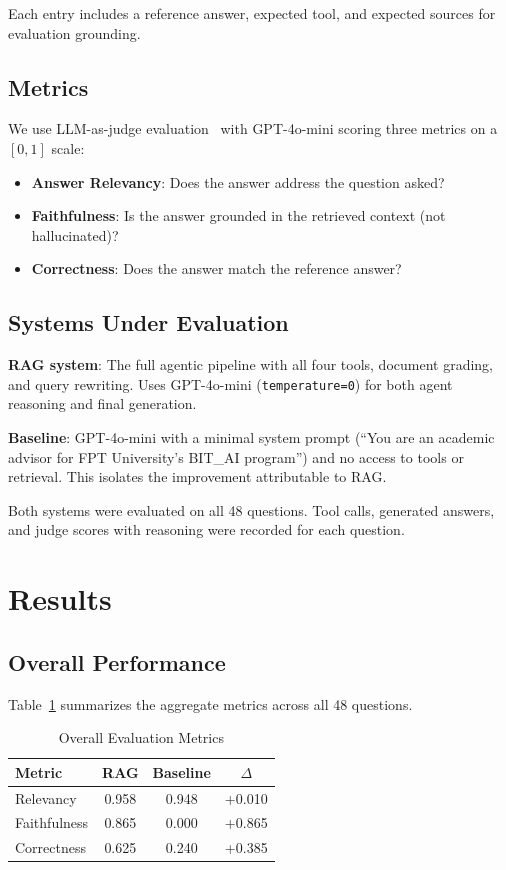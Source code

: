 \documentclass[lettersize,journal]{IEEEtran}
\begin{document}
Each entry includes a reference answer, expected tool, and expected sources for evaluation grounding.

\subsection{Metrics}

We use LLM-as-judge evaluation~\cite{ref_llm_judge} with GPT-4o-mini scoring three metrics on a $[0, 1]$ scale:
\begin{itemize}
    \item \textbf{Answer Relevancy}: Does the answer address the question asked?
    \item \textbf{Faithfulness}: Is the answer grounded in the retrieved context (not hallucinated)?
    \item \textbf{Correctness}: Does the answer match the reference answer?
\end{itemize}

\subsection{Systems Under Evaluation}

\textbf{RAG system}: The full agentic pipeline with all four tools, document grading, and query rewriting. Uses GPT-4o-mini (\texttt{temperature=0}) for both agent reasoning and final generation.

\textbf{Baseline}: GPT-4o-mini with a minimal system prompt (``You are an academic advisor for FPT University's BIT\_AI program'') and no access to tools or retrieval. This isolates the improvement attributable to RAG.

Both systems were evaluated on all 48 questions. Tool calls, generated answers, and judge scores with reasoning were recorded for each question.

\section{Results}

\subsection{Overall Performance}

Table~\ref{tab:overall} summarizes the aggregate metrics across all 48 questions.

\begin{table}[!t]
\caption{Overall Evaluation Metrics\label{tab:overall}}
\centering
\begin{tabular}{lccc}
\toprule
\textbf{Metric} & \textbf{RAG} & \textbf{Baseline} & \textbf{$\Delta$} \\
\midrule
Relevancy & 0.958 & 0.948 & +0.010 \\
Faithfulness & 0.865 & 0.000 & +0.865 \\
Correctness & 0.625 & 0.240 & +0.385 \\
\bottomrule
\end{tabular}
\end{table}
\end{document}
